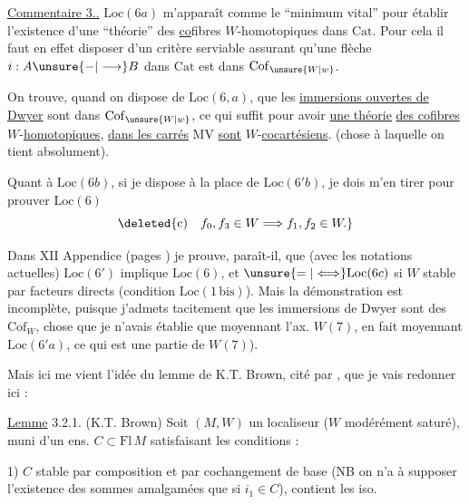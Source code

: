 \uline{Commentaire 3..} $\mathrm{Loc}(6a)$ m'apparaît comme le ``minimum vital'' pour établir l'existence d'une ``théorie'' des \uline{co}fibres $W$-homotopiques dans $\mathrm{Cat}$. Pour cela il faut en effet disposer d'un critère serviable assurant qu'une flèche $i:A\unsure{-|\longrightarrow}B$ dans $\mathrm{Cat}$ est dans $\mathrm{Cof}_{\unsure{W|w}}$.

On trouve, quand on dispose de $\mathrm{Loc}(6,a)$, que les \uline{immersions ouvertes de Dwyer} sont dans $\mathrm{Cof}_{\unsure{W|w}}$,  ce qui suffit pour avoir \uline{une  théorie} \uline{des cofibres} $W$-\uline{homotopiques}, \uline{dans  les carrés} $\mathrm{MV}$ \uline{sont} $W$-\uline{cocartésiens}. (chose à laquelle on tient absolument).

Quant à $\mathrm{Loc}(6b)$,  si je dispose à la place de $\mathrm{Loc}(6'b)$,  je dois m'en tirer pour prouver $\mathrm{Loc}(6)$
\[
\deleted{\text{c)}\quad f_0,f_3\in W\Longrightarrow f_1,f_2\in W.}
\]

Dans XII Appendice (pages ) je prouve, paraît-il, que (avec les notations actuelles) $\mathrm{Loc}(6')$ implique $\mathrm{Loc}(6)$, et $\unsure{=|\Longleftrightarrow}\mathrm{Loc}(6c)$ si $W$ stable par facteurs directs (condition $\mathrm{Loc}(1\,\mathrm{bis})$). Mais la démonstration est incomplète, puisque j'admets tacitement que les immersions de Dwyer sont des $\mathrm{Cof}_W$, chose que je n'avais établie que moyennant l'ax. $W(7)$, en fait moyennant $\mathrm{Loc}(6'a)$, ce qui est une partie de $W(7)$).

Mais ici me vient l'idée du lemme de K.T. Brown, cité par , que je vais redonner ici :

\uline{Lemme} 3.2.1. (K.T. Brown) Soit $(M,W)$ un localiseur ($W$ modérément saturé), muni d'un ens. $C\subset\mathrm{Fl}\,M$ satisfaisant les conditions :

1) $C$ stable par composition et par cochangement de base (NB on n'a  à supposer l'existence des sommes amalgamées
que si $i_1\in C$), contient les iso.

